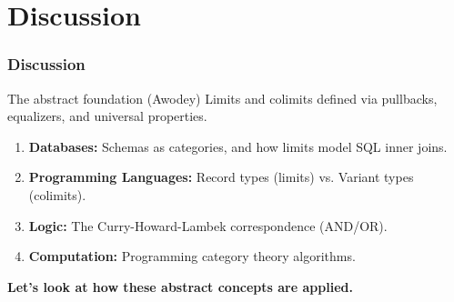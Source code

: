 \documentclass[11pt,t,usepdftitle=false,aspectratio=169]{beamer}
\begin{document}

\section{Discussion}

\begin{frame}
\frametitle{Discussion}
  \begin{block}{The abstract foundation (Awodey)}
    Limits and colimits defined via pullbacks, equalizers, and universal
    properties.
  \end{block}

  \vspace{0.4cm}
  
  \begin{enumerate}
    \item \textbf{Databases:} Schemas as categories, and how limits model SQL
      inner joins.
    \item \textbf{Programming Languages:} Record types (limits) vs. Variant
      types (colimits).
    \item \textbf{Logic:} The Curry-Howard-Lambek correspondence (AND/OR).
    \item \textbf{Computation:} Programming category theory algorithms.
  \end{enumerate}

  \vspace{0.6cm}
  \centering
  \textbf{\color{uibkorange} Let's look at how these abstract concepts are
  applied.}
\end{frame}
\end{document}
